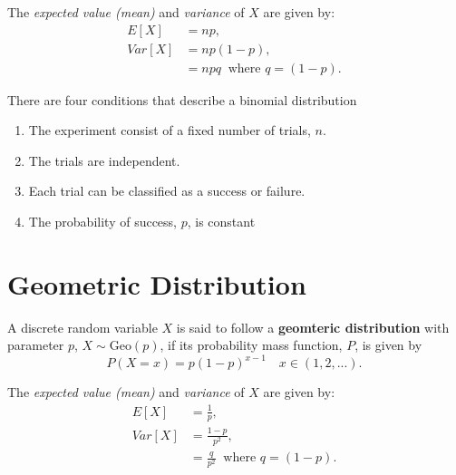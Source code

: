 \begin{note}
	The \textit{expected value (mean)} and \textit{variance} of $X$ are given by:
	\begin{align}
	E[X] &= np,  \label{mod2:eq:Binomial:Mean} \\ 
	Var[X] &= np(1-p), \label{mod2:eq:Binomial:Variance} \\
	&= npq  \: \text{ where } q = (1-p).\ 
	\end{align}
\end{note}

\begin{note} \label{mod2:note:Binomial:Conditions}
	There are four conditions that describe a binomial distribution
	\begin{enumerate}[label = (\roman*)]
		\item The experiment consist of a fixed number of trials, $n$.
		\item The trials are independent.
		\item Each trial can be classified as a success or failure.
		\item The probability of success, $p$, is constant
	\end{enumerate}
\end{note}



\section{Geometric Distribution} \label{mod2:section:Geometric}
\begin{defn}\label{mod2:defn:Geomtric}
	A discrete random variable $X$ is said to follow a \textbf{geomteric distribution} with parameter $p$, $X \sim \text{Geo}(p)$, if its probability mass function, $P$, is given by
\begin{equation}
P(X = x) = p(1-p)^{x-1} \quad x \in (1, 2, ...). \label{mod2:eq:GeometricDist} \ 
\end{equation} 
\end{defn}

\begin{note}
	The \textit{expected value (mean)} and \textit{variance} of $X$ are given by:
	\begin{align}
	E[X] &= \frac{1}{p},  \label{mod2:eq:Geometric:Mean} \\ 
	Var[X] &= \frac{1-p}{p^2}, \label{mod2:eq:Geomtric:Variance} \\
	&= \frac{q}{p^2}  \: \text{ where } q = (1-p).\ 
	\end{align}
\end{note}

